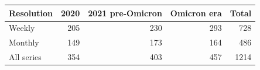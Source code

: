 \begin{tabular}{lrrrr}
\toprule
Resolution & 2020 & 2021 pre-Omicron & Omicron era & Total \\
\midrule
Weekly & 205 & 230 & 293 & 728 \\
Monthly & 149 & 173 & 164 & 486 \\
\midrule
All series & 354 & 403 & 457 & 1214 \\
\bottomrule
\end{tabular}